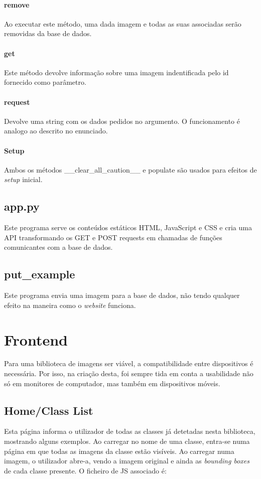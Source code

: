 \documentclass{report}
\begin{document}
\paragraph{remove}
Ao executar este método, uma dada imagem e todas as suas associadas serão removidas da base de dados.

\paragraph{get}
Este método devolve informação sobre uma imagem indentificada pelo id fornecido como parâmetro.

\paragraph{request}

Devolve uma string com os dados pedidos no argumento. O funcionamento é analogo ao descrito no enunciado.


\paragraph{Setup}
Ambos os métodos \_\_clear\_all\_caution\_\_ e  populate são usados para efeitos de \textit{setup} inicial.

\subsection{app.py}
Este programa serve os conteúdos estáticos \ac{HTML}, JavaScript e \ac{CSS} e cria uma API transformando os GET e POST requests em chamadas de funções comunicantes com a base de dados. 

\subsection{put\_example}
Este programa envia uma imagem para a base de dados, não tendo qualquer efeito na maneira como o \textit{website} funciona.

\section{Frontend}
Para uma biblioteca de imagens ser viável, a compatibilidade entre dispositivos é necessária. Por isso, na criação desta, foi sempre tida em conta a usabilidade não só em monitores de computador, mas também em dispositivos móveis. 

\subsection{Home/Class List}
Esta página informa o utilizador de todas as classes já detetadas nesta biblioteca, mostrando alguns exemplos. Ao carregar no nome de uma classe, entra-se numa página em que todas as imagens da classe estão visíveis. Ao carregar numa imagem, o utilizador abre-a, vendo a imagem original e ainda as \textit{bounding boxes} de cada classe presente. O ficheiro de \ac{JS} associado é:
\end{document}
